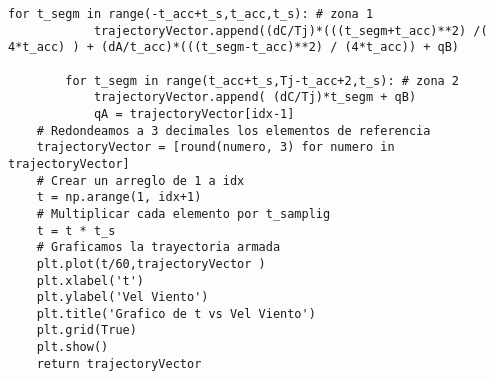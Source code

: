 \begin{lstlisting}[style=pythonstyle, caption={Algoritmo generador de referencias para el controlador PID.}, label=cdg:genTrayectoria, basicstyle=\ttfamily\fontsize{8}{8}\selectfont]
        for t_segm in range(-t_acc+t_s,t_acc,t_s): # zona 1  
            trajectoryVector.append((dC/Tj)*(((t_segm+t_acc)**2) /( 4*t_acc) ) + (dA/t_acc)*(((t_segm-t_acc)**2) / (4*t_acc)) + qB)  
            
        for t_segm in range(t_acc+t_s,Tj-t_acc+2,t_s): # zona 2
            trajectoryVector.append( (dC/Tj)*t_segm + qB)
            qA = trajectoryVector[idx-1]
    # Redondeamos a 3 decimales los elementos de referencia
    trajectoryVector = [round(numero, 3) for numero in trajectoryVector]
    # Crear un arreglo de 1 a idx
    t = np.arange(1, idx+1)
    # Multiplicar cada elemento por t_samplig
    t = t * t_s
    # Graficamos la trayectoria armada
    plt.plot(t/60,trajectoryVector )
    plt.xlabel('t')
    plt.ylabel('Vel Viento')
    plt.title('Grafico de t vs Vel Viento')
    plt.grid(True)
    plt.show()
    return trajectoryVector
\end{lstlisting}